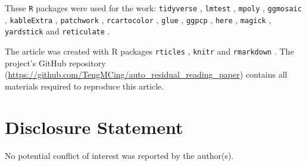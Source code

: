 \documentclass[]{interact}
\theoremstyle{plain}%
\theoremstyle{definition}
\theoremstyle{remark}
\begin{document}
These \texttt{R} packages were used for the work: \texttt{tidyverse}
\citep{tidyverse}, \texttt{lmtest} \citep{lmtest}, \texttt{mpoly}
\citep{mpoly}, \texttt{ggmosaic} \citep{ggmosaic}, \texttt{kableExtra}
\citep{kableextra}, \texttt{patchwork} \citep{patchwork},
\texttt{rcartocolor} \citep{rcartocolor}, \texttt{glue} \citep{glue},
\texttt{ggpcp} \citep{ggpcp}, \texttt{here} \citep{here},
\texttt{magick} \citep{magick}, \texttt{yardstick} \citep{yardstick} and
\texttt{reticulate} \citep{reticulate}.

The article was created with R packages \texttt{rticles}
\citep{rticles}, \texttt{knitr} \citep{knitr} and \texttt{rmarkdown}
\citep{rmarkdown}. The project's GitHub repository
(\url{https://github.com/TengMCing/auto_residual_reading_paper})
contains all materials required to reproduce this article.

\section*{Disclosure Statement}\label{disclosure-statement}

No potential conflict of interest was reported by the author(s).



\end{document}
